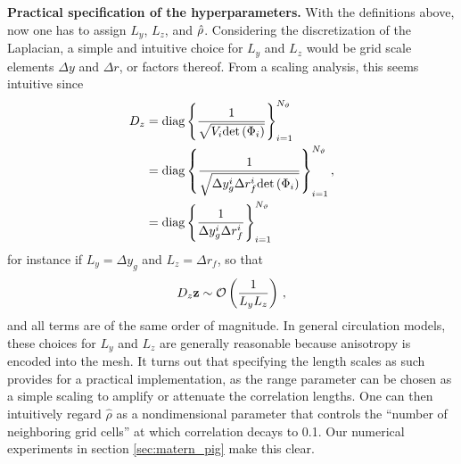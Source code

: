 \noindent\textbf{Practical specification of the hyperparameters.}
With the definitions above, now one has to assign $L_y$, $L_z$, and $\hat{\rho}$.
Considering the discretization of the Laplacian, a simple and intuitive choice
for $L_y$ and $L_z$ would be grid scale elements $\Delta y$ and $\Delta r$,
or factors thereof.
From a scaling analysis, this seems intuitive since
\begin{equation*}
    \begin{aligned}
        D_z
        &=
        \text{diag}\left\{\dfrac{1}{
            \sqrt{V_i\text{det}\left(\Phi_{i}\right)}}\right\}_{i=1}^{N_{\vartheta}} \\
        &=
        \text{diag}\left\{\dfrac{1}{
            \sqrt{\Delta y_{g}^{i}\Delta r_{f}^{i}
        \text{det}\left(\Phi_{i}\right)}}\right\}_{i=1}^{N_{\vartheta}} \\
        &= \text{diag}\left\{\dfrac{1}{
            \Delta y_{g}^{i}\Delta r_{f}^{i}}\right\}_{i=1}^{N_{\vartheta}}
    \end{aligned}\, ,
\end{equation*}
for instance if $L_y=\Delta y_g$ and $L_z=\Delta r_f$, so that
\begin{equation*}
    D_z\mathbf{z} \sim \mathcal{O}\left(\dfrac{1}{L_y L_z}\right) \, ,
\end{equation*}
and all terms are of the same order of magnitude.
In general circulation models, these choices for $L_y$ and $L_z$ are generally
reasonable because anisotropy is encoded into the mesh.
It turns out that specifying the length scales as such provides for a
practical implementation, as the range parameter can be chosen as a simple
scaling to amplify or attenuate the correlation lengths.
One can then intuitively regard $\hat\rho$ as a nondimensional parameter that
controls the
``number of neighboring grid cells'' at which correlation decays to 0.1.
Our numerical experiments in section \ref{sec:matern_pig} make this clear.
